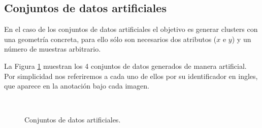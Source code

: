 \subsection{Conjuntos de datos artificiales}

En el caso de los conjuntos de datos artificiales el objetivo es generar clusters con una geometría concreta, para ello sólo son necesarios dos atributos ($x$ e $y$) y un número de muestras arbitrario.

La Figura \ref{fig:figure22} muestran los 4 conjuntos de datos generados de manera artificial. Por simplicidad nos referiremos a cada uno de ellos por su identificador en ingles, que aparece en la anotación bajo cada imagen.

\begin{figure}[bth]
	\myfloatalign
	\\
	\caption{Conjuntos de datos artificiales.}\label{fig:figure22}
\end{figure}

